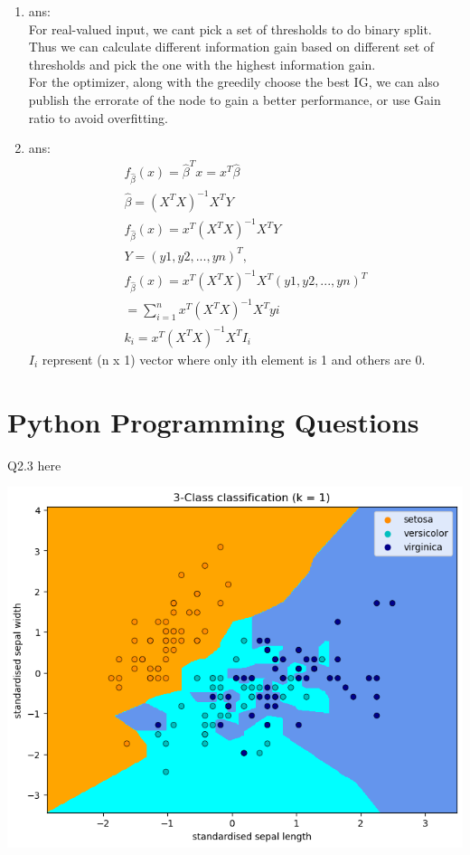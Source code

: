 \documentclass[12pt]{article}
\begin{document}
\begin{enumerate}
\item ans:\\
  For real-valued input, we cant pick a set of thresholds to do binary split. Thus we can calculate different information gain 
  based on different set of thresholds and pick the one with the highest information gain.\\
  For the optimizer, along with the greedily choose the best IG, we can also publish the errorate of the node to gain a better performance, or use Gain ratio to avoid overfitting.\\
\item ans:\\
\begin{gather*} 
  f_{\hat{\beta}}(x) = \hat{\beta}^T x  = x ^ T \hat{\beta} \\
  \hat{\beta} = (X^T X)^{-1} X^T Y \\
  f_{\hat{\beta}}(x) = x^T (X^T X)^{-1} X^T Y \\
  Y = (y1, y2, ..., yn)^T,  \\
  f_{\hat{\beta}}(x) = x^T (X^T X)^{-1} X^T (y1, y2, ..., yn)^T \\
  = \sum_{i=1}^n x^T (X^T X)^{-1} X^T yi \\
  k_i = x^T (X^T X)^{-1} X^T I_i
\end{gather*}
$I_i$ represent (n x 1) vector where only ith element is 1 and others are 0.
 
\end{enumerate}

\section{Python Programming Questions}


Q2.3 here

\includegraphics{2.3.1.png}
\end{document}
